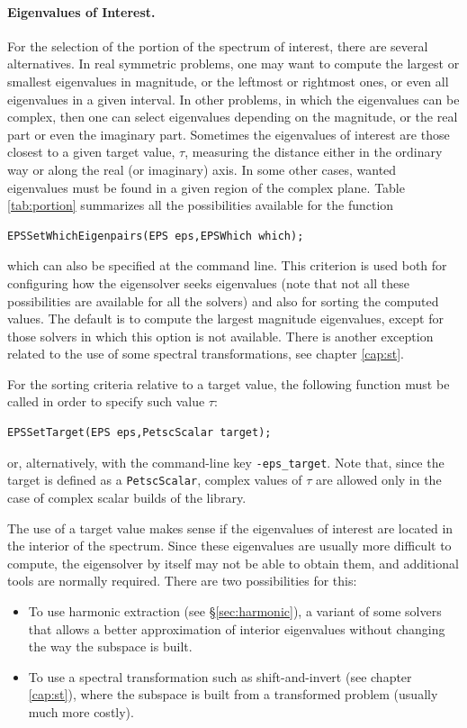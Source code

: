 \paragraph{Eigenvalues of Interest.}

For the selection of the portion of the spectrum of interest, there are several alternatives. In real symmetric problems, one may want to compute the largest or smallest eigenvalues in magnitude, or the leftmost or rightmost ones, or even all eigenvalues in a given interval. In other problems, in which the eigenvalues can be complex, then one can select eigenvalues depending on the magnitude, or the real part or even the imaginary part. Sometimes the eigenvalues of interest are those closest to a given target value, $\tau$, measuring the distance either in the ordinary way or along the real (or imaginary) axis. In some other cases, wanted eigenvalues must be found in a given region of the complex plane. Table \ref{tab:portion} summarizes all the possibilities available for the function
        \begin{Verbatim}[fontsize=\small]
        EPSSetWhichEigenpairs(EPS eps,EPSWhich which);
        \end{Verbatim}
which can also be specified at the command line. This criterion is used both for configuring how the eigensolver seeks eigenvalues (note that not all these possibilities are available for all the solvers) and also for sorting the computed values. The default is to compute the largest magnitude eigenvalues, except for those solvers in which this option is not available. There is another exception related to the use of some spectral transformations, see chapter \ref{cap:st}.

For the sorting criteria relative to a target value, the following function must be called in order to specify such value $\tau$:
        \begin{Verbatim}[fontsize=\small]
        EPSSetTarget(EPS eps,PetscScalar target);
        \end{Verbatim}
or, alternatively, with the command-line key \Verb!-eps_target!. Note that, since the target is defined as a \texttt{PetscScalar}, complex values of $\tau$ are allowed only in the case of complex scalar builds of the \slepc library.

The use of a target value makes sense if the eigenvalues of interest are located in the interior of the spectrum. Since these eigenvalues are usually more difficult to compute, the eigensolver by itself may not be able to obtain them, and additional tools are normally required.
There are two possibilities for this:
\begin{itemize}
\item To use harmonic extraction (see \S\ref{sec:harmonic}), a variant of some solvers that allows a better approximation of interior eigenvalues without changing the way the subspace is built.
\item To use a spectral transformation such as shift-and-invert (see chapter \ref{cap:st}), where the subspace is built from a transformed problem (usually much more costly).
\end{itemize}

